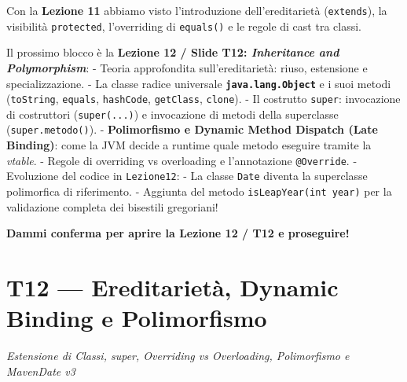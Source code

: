 \documentclass[11pt,a4paper,oneside]{report}
\newcommand{\passthrough}[1]{#1}
\begin{document}
\begin{studynote} Con la \textbf{Lezione 11} abbiamo visto l'introduzione
dell'ereditarietà (\passthrough{\lstinline!extends!}), la visibilità
\passthrough{\lstinline!protected!}, l'overriding di
\passthrough{\lstinline!equals()!} e le regole di cast tra classi.

Il prossimo blocco è la \textbf{Lezione 12 / Slide T12:
\emph{Inheritance and Polymorphism}}: - Teoria approfondita
sull'ereditarietà: riuso, estensione e specializzazione. - La classe
radice universale \textbf{\passthrough{\lstinline!java.lang.Object!}} e
i suoi metodi (\passthrough{\lstinline!toString!},
\passthrough{\lstinline!equals!}, \passthrough{\lstinline!hashCode!},
\passthrough{\lstinline!getClass!}, \passthrough{\lstinline!clone!}). -
Il costrutto \passthrough{\lstinline!super!}: invocazione di costruttori
(\passthrough{\lstinline!super(...)!}) e invocazione di metodi della
superclasse (\passthrough{\lstinline!super.metodo()!}). -
\textbf{Polimorfismo e Dynamic Method Dispatch (Late Binding)}: come la
JVM decide a runtime quale metodo eseguire tramite la \emph{vtable}. -
Regole di overriding vs overloading e l'annotazione
\passthrough{\lstinline!@Override!}. - Evoluzione del codice in
\passthrough{\lstinline!Lezione12!}: - La classe
\passthrough{\lstinline!Date!} diventa la superclasse polimorfica di
riferimento. - Aggiunta del metodo
\passthrough{\lstinline!isLeapYear(int year)!} per la validazione
completa dei bisestili gregoriani!
\end{studynote}

\textbf{Dammi conferma per aprire la Lezione 12 / T12 e proseguire!}

\newpage
\chapter[T12 --- Ereditarietà, Dynamic Binding e Pol]{T12 --- Ereditarietà, Dynamic Binding e Polimorfismo}
\label{chap:t12}

{\small\sffamily\color{accentblue!80!black}\textit{Estensione di Classi, super, Overriding vs Overloading, Polimorfismo e MavenDate v3}}

\vspace{0.8em}
\end{document}

